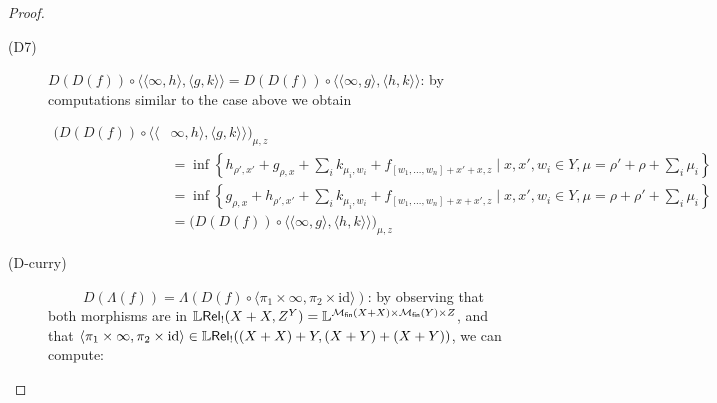 \begin{proof}
\begin{description}
\item[(D7)] $D(D(f))\circ \langle\langle \infty,h\rangle, \langle g,k\rangle\rangle= D(D(f))\circ \langle \langle \infty,g\rangle, \langle h,k\rangle\rangle$:
by computations similar to the case above we obtain

{
\small
\begin{align*}
\Big(D(D(f))\circ \langle \langle & \infty,h\rangle,\langle g,k\rangle\rangle\Big)_{\mu,z}\\
&=
\inf\left\{
h_{\rho',x'} + g_{\rho,x}+ \sum_{i}k_{\mu_{i},w_{i}}
+
f_{[w_{1},\dots, w_{n}]+x'+x,z}
\mid 
x,x',w_{i}\in Y, 
\mu=\rho'+\rho+\sum_{i}\mu_{i}
\right\}\\
&=
\inf\left\{
g_{\rho,x} + h_{\rho',x'}+ \sum_{i}k_{\mu_{i},w_{i}}
+
f_{[w_{1},\dots, w_{n}]+x+x',z}
\mid 
x,x',w_{i}\in Y, 
\mu=\rho+\rho'+\sum_{i}\mu_{i}
\right\}\\
&=
\Big(D(D(f))\circ \langle \langle\infty,g\rangle,\langle h,k\rangle\rangle\Big)_{\mu,z}
\end{align*}
}

\item[(D-curry)]  \ \ \ \ \  $D(\Lambda(f))=
\Lambda(D(f)\circ \langle \pi_{1}\times \infty, \pi_{2}\times \mathrm{id}\rangle)$:
by observing that both morphisms are 
in $\mathbb{L} \mathsf{Rel}_!(X+X, Z^{Y})= \mathbb{L}^{\mathcal{M}_{\mathsf{fin}}(X+X)\times \mathcal{M}_{\mathsf{fin}}(Y)\times Z}$, 
and that $ \langle \pi_{1}\times \infty, \pi_{2}\times \mathrm{id}\rangle
\in \mathbb{L} \mathsf{Rel}_!( (X+X)+Y  , (X+Y)+(X+Y) )$,
we can compute:


\end{description}
\end{proof}
